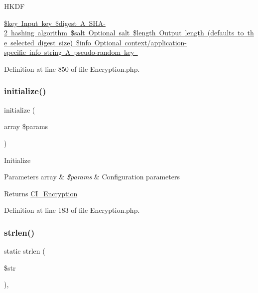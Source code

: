 H\+K\+DF

\mbox{\hyperlink{}{\$key Input key  \$digest A S\+H\+A-\/2 hashing algorithm  \$salt Optional salt  \$length Output length (defaults to the selected digest size)  \$info Optional context/application-\/specific info  string A pseudo-\/random key }}

Definition at line 850 of file Encryption.\+php.

\mbox{\label{class_c_i___encryption_ada6f73e99259423863fe312baa4dad10}} 
\subsubsection{\texorpdfstring{initialize()}{initialize()}}
{\footnotesize\ttfamily initialize (\begin{DoxyParamCaption}\item[{array}]{\$params }\end{DoxyParamCaption})}

Initialize


\begin{DoxyParams}[1]{Parameters}
array & {\em \$params} & Configuration parameters \\
\hline
\end{DoxyParams}
\begin{DoxyReturn}{Returns}
\mbox{\hyperlink{class_c_i___encryption}{C\+I\+\_\+\+Encryption}} 
\end{DoxyReturn}


Definition at line 183 of file Encryption.\+php.

\mbox{\label{class_c_i___encryption_a4c29a687d4ed62c26a10e41d98930d5f}} 
\subsubsection{\texorpdfstring{strlen()}{strlen()}}
{\footnotesize\ttfamily static strlen (\begin{DoxyParamCaption}\item[{}]{\$str }\end{DoxyParamCaption})\hspace{0.3cm}{\ttfamily [static]}, {\ttfamily [protected]}}


